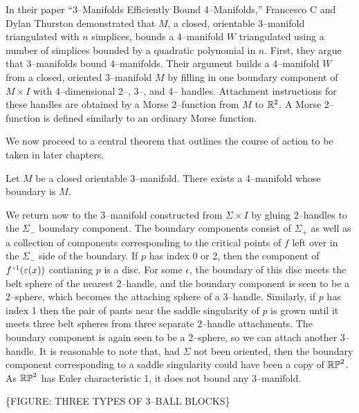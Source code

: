 \label{sec:3bound4}



In their paper ``3--Manifolds Efficiently Bound 4--Manifolds,'' Francesco C and Dylan Thurston demonstrated that $M$, a closed, orientable 3--manifold triangulated with $n$ simplices, bounds a 4--manifold $W$ triangulated using a number of simplices bounded by a quadratic polynomial in $n$.
First, they argue that 3--manifolds bound 4--manifolds.
Their argument builds a 4--manifold $W$ from a closed, oriented 3--manifold $M$ by filling in one boundary component of $M\times I$ with 4--dimensional 2--, 3--, and 4-- handles.
Attachment instructions for these handles are obtained by a Morse 2--function from $M$ to $\mathbb{R}^2$.
A Morse 2--function is defined similarly to an ordinary Morse function.




We now proceed to a central theorem that outlines the course of action to be taken in later chapters.

\begin{theorem}
	\label{thm:3bound4}
	Let $M$ be a closed orientable 3--manifold.
	There exists a 4--manifold whose boundary is $M$.
\end{theorem}


We return now to the 3--manifold constructed from $\Sigma\times I$ by gluing 2--handles to the $\Sigma_-$ boundary component.
The boundary components consist of $\Sigma_+$ as well as a collection of components corresponding to the critical points of $f$ left over in the $\Sigma_-$ side of the boundary.
If $p$ has index 0 or 2, then the component of $f^{\,\text{-}1}(\varepsilon(x))$ contianing $p$ is a disc.
For some $\epsilon$, the boundary of this disc meets the belt sphere of the nearest 2--handle, and the boundary component is seen to be a 2--sphere, which becomes the attaching sphere of a 3--handle.
Similarly, if $p$ has index 1 then the pair of pants near the saddle singularity of $p$ is grown until it meets three belt spheres from three separate 2--handle attachments.
The boundary component is again seen to be a 2--sphere, so we can attach another 3--handle.
It is reasonable to note that, had $\Sigma$ not been oriented, then the boundary component corresponding to a saddle singularity could have been a copy of $\mathbb{RP}^2$.
As $\mathbb{RP}^2$ has Euler characteristic 1, it does not bound any 3--manifold.

\{FIGURE: THREE TYPES OF 3--BALL BLOCKS\}

